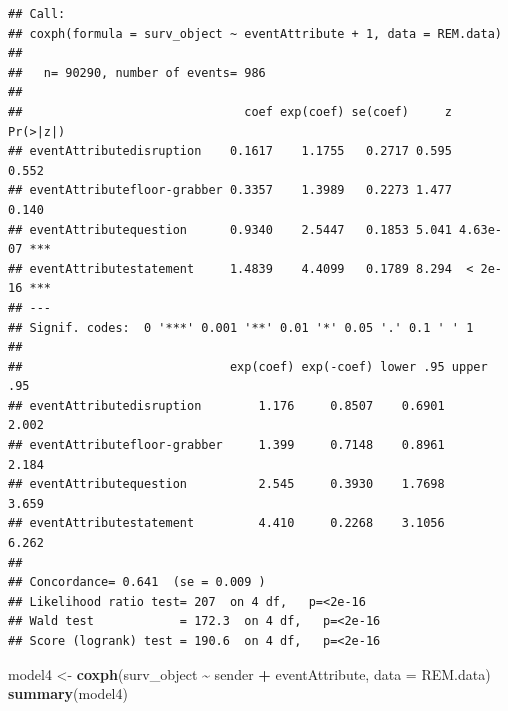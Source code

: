 \documentclass[
]{article}
\newenvironment{Shaded}{\begin{snugshade}}{\end{snugshade}}
\newcommand{\AttributeTok}[1]{\textcolor[rgb]{0.13,0.29,0.53}{#1}}
\newcommand{\FunctionTok}[1]{\textcolor[rgb]{0.13,0.29,0.53}{\textbf{#1}}}
\newcommand{\NormalTok}[1]{#1}
\newcommand{\OtherTok}[1]{\textcolor[rgb]{0.56,0.35,0.01}{#1}}
\newcommand{\SpecialCharTok}[1]{\textcolor[rgb]{0.81,0.36,0.00}{\textbf{#1}}}
\begin{document}
\begin{verbatim}
## Call:
## coxph(formula = surv_object ~ eventAttribute + 1, data = REM.data)
## 
##   n= 90290, number of events= 986 
## 
##                               coef exp(coef) se(coef)     z Pr(>|z|)    
## eventAttributedisruption    0.1617    1.1755   0.2717 0.595    0.552    
## eventAttributefloor-grabber 0.3357    1.3989   0.2273 1.477    0.140    
## eventAttributequestion      0.9340    2.5447   0.1853 5.041 4.63e-07 ***
## eventAttributestatement     1.4839    4.4099   0.1789 8.294  < 2e-16 ***
## ---
## Signif. codes:  0 '***' 0.001 '**' 0.01 '*' 0.05 '.' 0.1 ' ' 1
## 
##                             exp(coef) exp(-coef) lower .95 upper .95
## eventAttributedisruption        1.176     0.8507    0.6901     2.002
## eventAttributefloor-grabber     1.399     0.7148    0.8961     2.184
## eventAttributequestion          2.545     0.3930    1.7698     3.659
## eventAttributestatement         4.410     0.2268    3.1056     6.262
## 
## Concordance= 0.641  (se = 0.009 )
## Likelihood ratio test= 207  on 4 df,   p=<2e-16
## Wald test            = 172.3  on 4 df,   p=<2e-16
## Score (logrank) test = 190.6  on 4 df,   p=<2e-16
\end{verbatim}

\begin{Shaded}
\begin{Highlighting}[]
\NormalTok{model4 }\OtherTok{\textless{}{-}} \FunctionTok{coxph}\NormalTok{(surv\_object }\SpecialCharTok{\textasciitilde{}}\NormalTok{ sender }\SpecialCharTok{+}\NormalTok{ eventAttribute, }\AttributeTok{data =}\NormalTok{ REM.data)}
\FunctionTok{summary}\NormalTok{(model4)}
\end{Highlighting}
\end{Shaded}
\end{document}
